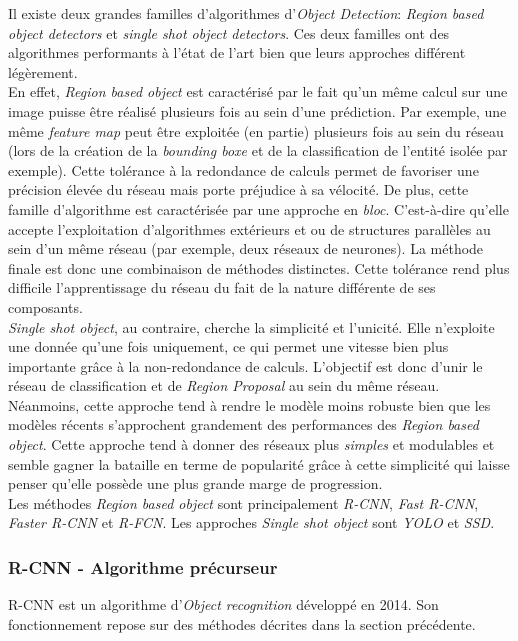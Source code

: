 \noindent Il existe deux grandes familles d'algorithmes d'\textit{Object Detection}: \textit{Region based object detectors} et \textit{single shot object detectors}. Ces deux familles ont des algorithmes performants à l'état de l'art bien que leurs approches différent légèrement.\\

\noindent En effet, \textit{Region based object} est caractérisé par le fait qu'un même calcul sur une image puisse être réalisé plusieurs fois au sein d'une prédiction. Par exemple, une même \textit{feature map} peut être exploitée (en partie) plusieurs fois au sein du réseau (lors de la création de la \textit{bounding boxe} et de la classification de l'entité isolée par exemple). Cette tolérance à la redondance de calculs permet de favoriser une précision élevée du réseau mais porte préjudice à sa vélocité. De plus, cette famille d'algorithme est caractérisée par une approche en \textit{bloc}. C'est-à-dire qu'elle accepte l'exploitation d'algorithmes extérieurs et ou de structures parallèles au sein d'un même réseau (par exemple, deux réseaux de neurones). La méthode finale est donc une combinaison de méthodes distinctes. Cette tolérance rend plus difficile l'apprentissage du réseau du fait de la nature différente de ses composants.\\

\noindent \textit{Single shot object}, au contraire, cherche la simplicité et l'unicité. Elle n'exploite une donnée qu'une fois uniquement, ce qui permet une vitesse bien plus importante grâce à la non-redondance de calculs. L'objectif est donc d'unir le réseau de classification et de \textit{Region Proposal} au sein du même réseau. Néanmoins, cette approche tend à rendre le modèle moins robuste bien que les modèles récents s'approchent grandement des performances des \textit{Region based object}. Cette approche tend à donner des réseaux plus \textit{simples} et modulables et semble gagner la bataille en terme de popularité grâce à cette simplicité qui laisse penser qu'elle possède une plus grande marge de progression.\\

\noindent Les méthodes \textit{Region based object} sont principalement \textit{R-CNN}, \textit{Fast R-CNN}, \textit{Faster R-CNN} et \textit{R-FCN}. Les approches \textit{Single shot object} sont \textit{YOLO} et \textit{SSD}.

\subsubsection{R-CNN - Algorithme précurseur}
R-CNN\cite{rcnn} est un algorithme d'\textit{Object recognition} développé en 2014. Son fonctionnement repose sur des méthodes décrites dans la section précédente.\\

